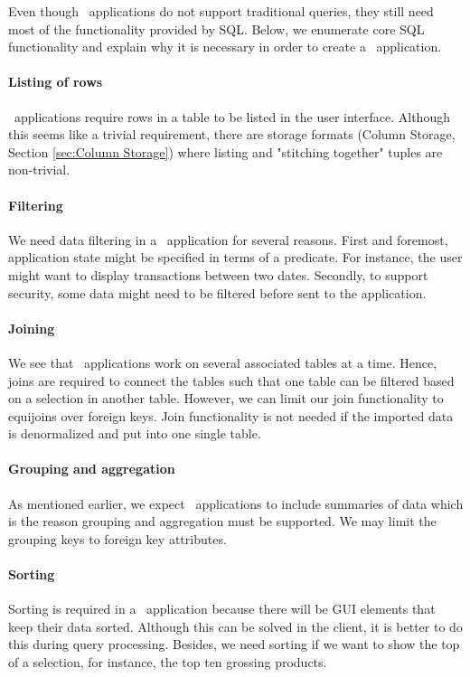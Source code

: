 Even though \bd~applications do not support traditional queries, they still need most of the functionality provided by SQL. Below, we enumerate core SQL functionality and explain why it is necessary in order to create a \bd~application.

\paragraph{Listing of rows}
\bd~applications require rows in a table to be listed in the user interface. Although this seems like a trivial requirement, there are storage formats (Column Storage, Section \ref{sec:Column Storage}) where listing and "stitching together" tuples are non-trivial. 

\paragraph{Filtering}
We need data filtering in a \bd~application for several reasons. First and foremost, application state might be specified in terms of a predicate. For instance, the user might want to display transactions between two dates. Secondly, to support security, some data might need to be filtered before sent to the application.

\paragraph{Joining}
We see that \bd~applications work on several associated tables at a time. Hence, joins are required to connect the tables such that one table can be filtered based on a selection in another table. However, we can limit our join functionality to equijoins over foreign keys. Join functionality is not needed if the imported data is denormalized and put into one single table.

\paragraph{Grouping and aggregation}
\label{par:Grouping and aggregation}
As mentioned earlier, we expect \bd~applications to include summaries of data which is the reason grouping and aggregation must be supported. We may limit the grouping keys to foreign key attributes.

\paragraph{Sorting}
\label{par:Sorting}
Sorting is required in a \bd~application because there will be GUI elements that keep their data sorted. Although this can be solved in the client, it is better to do this during query processing. Besides, we need sorting if we want to show the top of a selection, for instance, the top ten grossing products.

